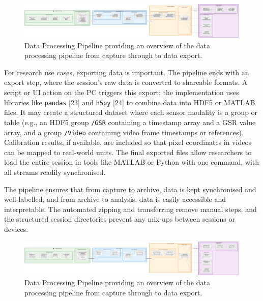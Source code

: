 \begin{figure}[htbp]
  \centering
  \includegraphics[width=\textwidth]{../../diagrams/fig_4_06_data_processing_pipeline.png}
  \caption{Data Processing Pipeline providing an overview of the data processing pipeline from capture through to data export.}
  \label{fig:4_06_data_processing_pipeline}
\end{figure}

For research use cases, exporting data is important. The pipeline ends with an export step, where the session's raw data is converted to shareable formats. A script or UI action on the PC triggers this export: the implementation uses libraries like \texttt{pandas} [23] and \texttt{h5py} [24] to combine data into HDF5 or MATLAB files. It may create a structured dataset where each sensor modality is a group or table (e.g., an HDF5 group \texttt{/GSR} containing a timestamp array and a GSR value array, and a group \texttt{/Video} containing video frame timestamps or references). Calibration results, if available, are included so that pixel coordinates in videos can be mapped to real-world units. The final exported files allow researchers to load the entire session in tools like MATLAB or Python with one command, with all streams readily synchronised.

The pipeline ensures that from capture to archive, data is kept synchronised and well-labelled, and from archive to analysis, data is easily accessible and interpretable. The automated zipping and transferring remove manual steps, and the structured session directories prevent any mix-ups between sessions or devices.

\begin{figure}[htbp]
  \centering
  \includegraphics[width=\textwidth]{../../diagrams/fig_4_06_data_processing_pipeline.png}
  \caption{Data Processing Pipeline providing an overview of the data processing pipeline from capture through to data export.}
  \label{fig:4_06_data_processing_pipeline_repeat}
\end{figure}

